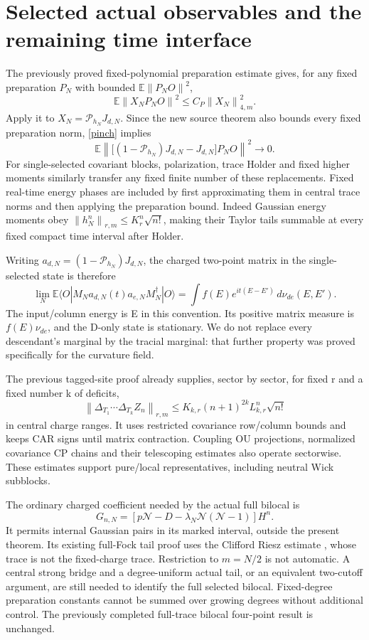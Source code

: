 \documentclass[11pt]{article}
\newcommand{\E}{\mathbb E}
\newcommand{\norm}[1]{\left\lVert#1\right\rVert}
\begin{document}
\section{Selected actual observables and the remaining time interface}
The previously proved fixed-polynomial preparation estimate
\cite{polynomial} gives, for any fixed preparation $P_N$ with bounded
$\E\norm{P_NO}^2$,
\[
 \E\norm{X_NP_NO}^2\le C_P\norm{X_N}_{4,m}^2.
\]
Apply it to $X_N=\mathcal P_{h_N}J_{d,N}$. Since the new source theorem
also bounds every fixed preparation norm, \eqref{pinch} implies
\[
 \E\norm{\bigl[(1-\mathcal P_{h_N})J_{d,N}-J_{d,N}\bigr]P_NO}^2
 \longrightarrow0.
\]
For single-selected covariant blocks, polarization, trace Holder and
fixed higher moments similarly transfer any fixed finite number of
these replacements. Fixed real-time energy phases are included by
first approximating them in central trace norms and then applying the
preparation bound. Indeed Gaussian energy moments obey
$\norm{h_N^n}_{r,m}\le K_r^n\sqrt{n!}$, making their Taylor tails
summable at every fixed compact time interval after Holder.

Writing $a_{d,N}=(1-\mathcal P_{h_N})J_{d,N}$, the charged two-point
matrix in the single-selected state is therefore
\begin{equation}
 \lim_N\E\langle O|M_N a_{d,N}(t)a_{e,N}M_N^\dagger|O\rangle
 =\int f(E)e^{it(E-E')}\,d\nu_{de}(E,E').\label{kernel}
\end{equation}
The input/column energy is E in this convention. Its positive matrix
measure is $f(E)\nu_{de}$, and the D-only state is stationary. We do
not replace every descendant's marginal by the tracial marginal:
that further property was proved specifically for the curvature field.

The previous tagged-site proof \cite{tails} already supplies, sector
by sector, for fixed r and a fixed number k of deficits,
\[
 \norm{\Delta_{T_1}\cdots\Delta_{T_k}Z_n}_{r,m}
 \le K_{k,r}(n+1)^{2k}L_{k,r}^n\sqrt{n!}
\]
in central charge ranges. It uses restricted covariance row/column
bounds and keeps CAR signs until matrix contraction. Coupling OU
projections, normalized covariance CP chains and their telescoping
estimates also operate sectorwise. These estimates support pure/local
representatives, including neutral Wick subblocks.

The ordinary charged coefficient needed by the actual full bilocal is
\[
 G_{n,N}=[p\mathcal N-D-\lambda_N\mathcal N(\mathcal N-1)]H^n.
\]
It permits internal Gaussian pairs in its marked interval, outside
the present theorem. Its existing full-Fock tail proof uses the
Clifford Riesz estimate \cite{belp}, whose trace is not the fixed-charge
trace. Restriction to $m=N/2$ is not automatic. A central strong bridge
and a degree-uniform actual tail, or an equivalent two-cutoff argument,
are still needed to identify the full selected bilocal. Fixed-degree
preparation constants cannot be summed over growing degrees without
additional control. The previously completed full-trace bilocal four-point
result is unchanged.
\end{document}
